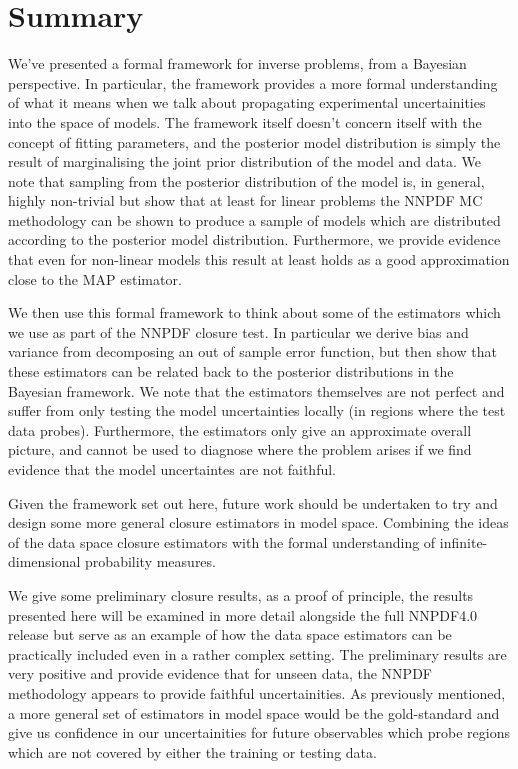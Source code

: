 \section{Summary}

We've presented a formal framework for inverse problems, from a Bayesian
perspective. In particular, the framework provides a more formal understanding
of what it means when we talk about propagating experimental uncertainities
into the space of models. The framework itself doesn't concern itself with
the concept of fitting parameters, and the posterior model distribution is simply
the result of marginalising the joint prior distribution of the model and
data. We note that sampling from the posterior distribution of the model is,
in general, highly non-trivial but show that at least for linear problems the
NNPDF MC methodology can be shown to produce a sample of models which are
distributed according to the posterior model distribution. Furthermore, we
provide evidence that even for non-linear models this result at least holds
as a good approximation close to the MAP estimator.

We then use this formal framework to think about some of the estimators which
we use as part of the NNPDF closure test. In particular we derive bias and
variance from decomposing an out of sample error function, but then show
that these estimators can be related back to the posterior distributions in
the Bayesian framework. We note that the estimators themselves are not perfect
and suffer from only testing the model uncertainties locally (in regions where
the test data probes). Furthermore, the estimators only give an approximate
overall picture, and cannot be used to diagnose where the problem arises if
we find evidence that the model uncertaintes are not faithful.

Given the framework set out here, future work should be undertaken to try and
design some more general closure estimators in model space. Combining the ideas
of the data space closure estimators with the formal understanding of
infinite-dimensional probability measures.

We give some preliminary closure results, as a proof of principle, the results
presented here will be examined in more detail alongside the full NNPDF4.0
release but serve as an example of how the data space estimators can be practically
included even in a rather complex setting. The preliminary results are very
positive and provide evidence that for unseen data, the NNPDF methodology
appears to provide faithful uncertainities. As previously mentioned, a more
general set of estimators in model space would be the gold-standard and give
us confidence in our uncertainities for future observables which probe
regions which are not covered by either the training or testing data.

